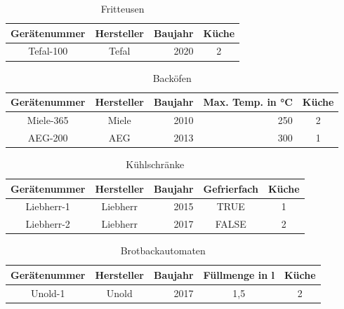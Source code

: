 \begin{table}[!h]
    \centering
    \begin{tabular}{c|c|c|c}
    \hline
    \rowcolor[HTML]{EFEFEF} 
    \textbf{Gerätenummer} & \textbf{Hersteller} & \textbf{Baujahr} & \textbf{Küche} \\ \hline
    Tefal-100 & Tefal & \multicolumn{1}{r|}{2020} & 2 \\ \hline
    \end{tabular}
    \caption{Fritteusen}
    \label{tab:fritteuse}
\end{table}

\begin{table}[!h]
    \centering
    \begin{tabular}{c|c|r|r|c}
    \hline
    \rowcolor[HTML]{EFEFEF} 
    \textbf{Gerätenummer} & \textbf{Hersteller} & \multicolumn{1}{c|}{\cellcolor[HTML]{EFEFEF}\textbf{Baujahr}} & \multicolumn{1}{c|}{\cellcolor[HTML]{EFEFEF}\textbf{Max. Temp. in °C}} & \textbf{Küche} \\ \hline
    Miele-365 & Miele & 2010 & 250 & 2 \\
    AEG-200 & AEG & 2013 & 300 & 1 \\ \hline
    \end{tabular}
    \caption{Backöfen}
    \label{tab:backoefen}
\end{table}

\begin{table}[!h]
    \centering
    \begin{tabular}{c|c|r|c|c}
    \hline
    \rowcolor[HTML]{EFEFEF} 
    \textbf{Gerätenummer} & \textbf{Hersteller} & \multicolumn{1}{c|}{\cellcolor[HTML]{EFEFEF}\textbf{Baujahr}} & \textbf{Gefrierfach} & \textbf{Küche} \\ \hline
    Liebherr-1 & Liebherr & 2015 & TRUE & 1 \\
    Liebherr-2 & Liebherr & 2017 & FALSE & 2 \\ \hline
    \end{tabular}
    \caption{Kühlschränke}
    \label{tab:kuehlschraenke}
\end{table}

\begin{table}[!h]
    \centering
    \begin{tabular}{c|c|c|c|c}
    \hline
    \rowcolor[HTML]{EFEFEF} 
    \textbf{Gerätenummer} & \textbf{Hersteller} & \textbf{Baujahr} & \textbf{Füllmenge in l} & \textbf{Küche} \\ \hline
    Unold-1 & Unold & \multicolumn{1}{r|}{2017} & 1,5 & 2 \\ \hline
    \end{tabular}
    \caption{Brotbackautomaten}
    \label{tab:brotbackautomaten}
\end{table}

